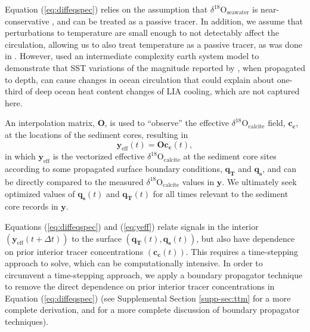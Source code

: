 \documentclass[draft]{agujournal2019}
\begin{document}
Equation (\ref{eq:diffeqspec}) relies on the assumption that $\delta^{18}\mathrm{O}_{\mathrm{seawater}}$ is near-conservative \cite[]{Lynch-Stieglitz-2003:Tracers}, and can be treated as a passive tracer. In addition, we assume that perturbations to temperature are small enough to not detectably affect the circulation, allowing us to also treat temperature as a passive tracer, as was done in . However,  used an intermediate complexity earth system model to demonstrate that SST variations of the magnitude reported by , when propagated to depth, can cause changes in ocean circulation that could explain about one-third of deep ocean heat content changes of LIA cooling, which are not captured here. 

An interpolation matrix, $\mathbf{O}$, is used to ``observe'' the effective $\delta^{18}\mathrm{O}_{\mathrm{calcite}}$ field, $\mathbf{c_{c}}$, at the locations of the sediment cores, resulting in
\begin{equation}
\label{eq:yeff}
\mathbf{y}_{\mathrm{eff}}(t) = \mathbf{O}\mathbf{c_{c}}(t), 
\end{equation}
in which $\mathbf{y}_{\mathrm{eff}}$ is the vectorized effective $\delta^{18}\mathrm{O}_{\mathrm{calcite}}$ at the sediment core sites according to some propagated surface boundary conditions, $\mathbf{q_{T}}$ and $\mathbf{q_{s}}$, and can be directly compared to the measured $\delta^{18}\mathrm{O}_{\mathrm{calcite}}$ values in $\mathbf{y}$. We ultimately seek optimized values of $\mathbf{q_{s}}(t)$ and $\mathbf{q_{T}}(t)$ for all times relevant to the sediment core records in $\mathbf{y}$.

Equations (\ref{eq:diffeqspec}) and (\ref{eq:yeff}) relate signals in the interior $(\mathbf{y}_{\mathrm{eff}}(t+\Delta t))$ to the surface $(\mathbf{q_{T}}(t), \mathbf{q_{s}}(t))$, but also have dependence on prior interior tracer concentrations $(\mathbf{c_{c}}(t))$. This requires a time-stepping approach to solve, which can be computationally intensive. In order to circumvent a time-stepping approach, we apply a boundary propagator technique to remove the direct dependence on prior interior tracer concentrations in Equation (\ref{eq:diffeqspec}) (see Supplemental Section \ref{supp-sec:ttm} for a more complete derivation, and  for a more complete discussion of boundary propagator techniques). 
\end{document}
